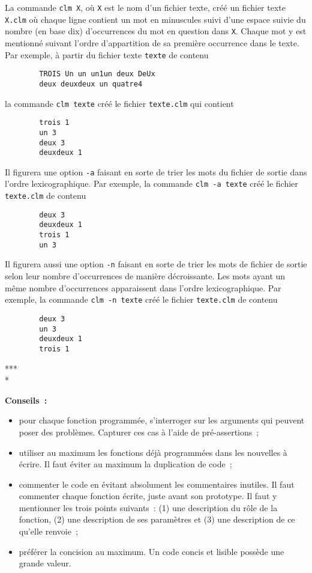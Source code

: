 \documentclass[12pt]{article}
\theoremstyle{definition}
\begin{document}
La commande {\tt clm X}, où {\tt X} est le nom d'un fichier texte, créé
un fichier texte {\tt X.clm} où chaque ligne contient un mot 
en minuscules suivi d'une espace suivie du nombre (en base dix) 
d'occurrences du mot en question dans {\tt X}. Chaque mot y est 
mentionné suivant l'ordre d'appartition de sa première
occurrence dans le texte. Par exemple, à partir du fichier texte {\tt texte} de contenu
\begin{verbatim}
        TROIS Un un un1un deux DeUx 
        deux deuxdeux un quatre4
\end{verbatim}
la commande {\tt clm texte} créé le fichier {\tt texte.clm} qui contient
\begin{verbatim}
        trois 1
        un 3
        deux 3
        deuxdeux 1
\end{verbatim}
\medskip

Il figurera une option {\tt -a} faisant en sorte de trier
les mots du fichier de sortie dans l'ordre lexicographique. Par exemple,
la commande {\tt clm -a texte} créé le fichier {\tt texte.clm} de contenu
\begin{verbatim}
        deux 3
        deuxdeux 1
        trois 1
        un 3
\end{verbatim}
Il figurera aussi une option {\tt -n} faisant en sorte de 
trier les mots de fichier de sortie selon leur nombre d'occurrences de 
manière décroissante. Les mots ayant un même nombre d'occurrences apparaissent
dans l'ordre lexicographique. Par exemple, la commande {\tt clm -n texte} créé 
le fichier {\tt texte.clm} de contenu
\begin{verbatim}
        deux 3
        un 3
        deuxdeux 1
        trois 1
\end{verbatim}

\begin{center} *** \\ * \end{center}
\bigskip

{\bf Conseils~:}
\begin{itemize}
    \item pour chaque fonction programmée, s'interroger sur les arguments
    qui peuvent poser des problèmes. Capturer ces cas à l'aide de
    pré-assertions~;
    \item utiliser au maximum les fonctions déjà programmées dans les
    nouvelles à écrire. Il faut éviter au maximum la duplication de code~;
    \item commenter le code en évitant absolument les commentaires inutiles.
    Il faut commenter chaque fonction écrite, juste avant son prototype.
    Il faut y mentionner les trois points suivants~: (1) une description
    du rôle de la fonction, (2) une description de ses paramètres et (3)
    une description de ce qu'elle renvoie~;
    \item préférer la concision au maximum. Un code concis et lisible
    possède une grande valeur.
\end{itemize}
\bigskip
\bigskip
\end{document}
